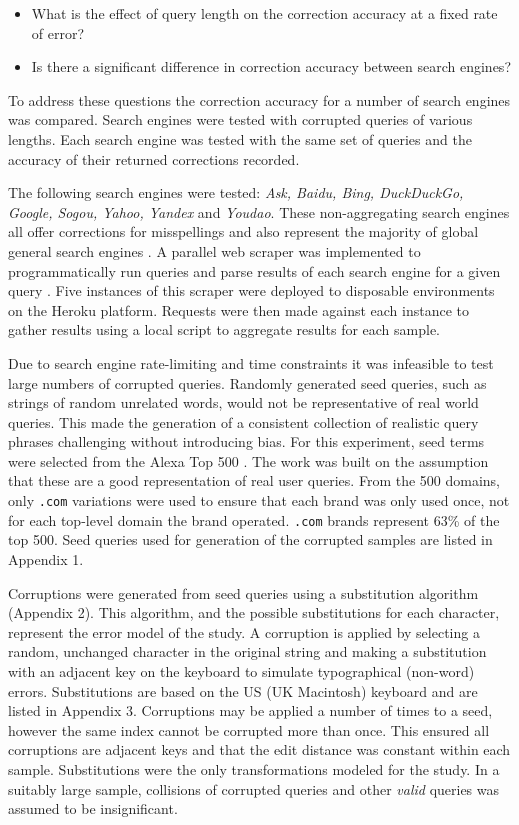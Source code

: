 \documentclass{csfourzero}
\begin{document}
\begin{itemize}
  \item{What is the effect of query length on the correction accuracy at a fixed rate of error?}
  \item{Is there a significant difference in correction accuracy between search engines?}
\end{itemize}

\noindent
To address these questions the correction accuracy for a number of search engines was compared. Search engines were tested with corrupted queries of various lengths. Each search engine was tested with the same set of queries and the accuracy of their returned corrections recorded.

The following search engines were tested: \textit{Ask, Baidu, Bing, DuckDuckGo, Google, Sogou, Yahoo, Yandex} and \textit{Youdao}. These non-aggregating search engines all offer corrections for misspellings and also represent the majority of global general search engines \cite{searchenginewiki}. A parallel web scraper was implemented to programmatically run queries and parse results of each search engine for a given query \cite{scraper}. Five instances of this scraper were deployed to disposable environments on the Heroku platform. Requests were then made against each instance to gather results using a local script to aggregate results for each sample.

Due to search engine rate-limiting and time constraints it was infeasible to test large numbers of corrupted queries. Randomly generated seed queries, such as strings of random unrelated words, would not be representative of real world queries. This made the generation of a consistent collection of realistic query phrases challenging without introducing bias. For this experiment, seed terms were selected from the Alexa Top 500 \cite{alexatop500}. The work was built on the assumption that these are a good representation of real user queries. From the 500 domains, only \texttt{.com} variations were used to ensure that each brand was only used once, not for each top-level domain the brand operated. \texttt{.com} brands represent 63\% of the top 500. Seed queries used for generation of the corrupted samples are listed in Appendix 1.

Corruptions were generated from seed queries using a substitution algorithm (Appendix 2). This algorithm, and the possible substitutions for each character, represent the error model of the study. A corruption is applied by selecting a random, unchanged character in the original string and making a substitution with an adjacent key on the keyboard to simulate typographical (non-word) errors. Substitutions are based on the US (UK Macintosh) keyboard and are listed in Appendix 3. Corruptions may be applied a number of times to a seed, however the same index cannot be corrupted more than once. This ensured all corruptions are adjacent keys and that the edit distance was constant within each sample. Substitutions were the only transformations modeled for the study. In a suitably large sample, collisions of corrupted queries and other \textit{valid} queries was assumed to be insignificant.
\end{document}

